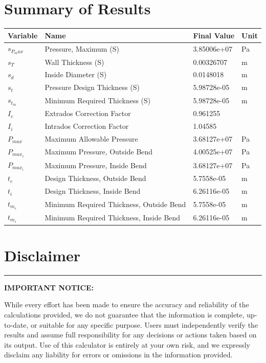 \documentclass[11pt,a4paper]{article}
\begin{document}
\section{Summary of Results}

\begin{longtable}{llll}
\toprule
Variable & Name & Final Value & Unit \\
\midrule
\endhead
$s_{P_max}$ & Pressure, Maximum (S) & 3.85006e+07 & Pa \\
$s_{T}$ & Wall Thickness (S) & 0.00326707 & m \\
$s_{d}$ & Inside Diameter (S) & 0.0148018 & m \\
$s_{t}$ & Pressure Design Thickness (S) & 5.98728e-05 & m \\
$s_{t_m}$ & Minimum Required Thickness (S) & 5.98728e-05 & m \\
$I_{e}$ & Extrados Correction Factor & 0.961255 &  \\
$I_{i}$ & Intrados Correction Factor & 1.04585 &  \\
$P_{max}$ & Maximum Allowable Pressure & 3.68127e+07 & Pa \\
$P_{max_e}$ & Maximum Pressure, Outside Bend & 4.00525e+07 & Pa \\
$P_{max_i}$ & Maximum Pressure, Inside Bend & 3.68127e+07 & Pa \\
$t_{e}$ & Design Thickness, Outside Bend & 5.7558e-05 & m \\
$t_{i}$ & Design Thickness, Inside Bend & 6.26116e-05 & m \\
$t_{m_e}$ & Minimum Required Thickness, Outside Bend & 5.7558e-05 & m \\
$t_{m_i}$ & Minimum Required Thickness, Inside Bend & 6.26116e-05 & m \\
\bottomrule
\end{longtable}

\clearpage

\section*{Disclaimer}

\begin{center}
\rule{\textwidth}{0.4pt}
\end{center}

\noindent\textbf{IMPORTANT NOTICE:}

\noindent While every effort has been made to ensure the accuracy and reliability of the calculations provided, we do not guarantee that the information is complete, up-to-date, or suitable for any specific purpose. Users must independently verify the results and assume full responsibility for any decisions or actions taken based on its output. Use of this calculator is entirely at your own risk, and we expressly disclaim any liability for errors or omissions in the information provided.
\end{document}
